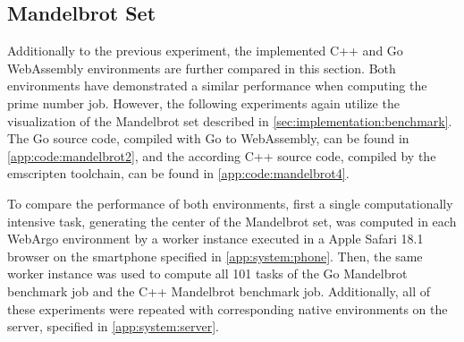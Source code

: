 \subsection{Mandelbrot Set}
Additionally to the previous experiment, the implemented C++ and Go WebAssembly environments are further compared in this section. Both environments have demonstrated a similar performance when computing the prime number job. However, the following experiments again utilize the visualization of the Mandelbrot set described in \autoref{sec:implementation:benchmark}. The Go source code, compiled with Go \cite{methodology:go} to WebAssembly, can be found in \autoref{app:code:mandelbrot2}, and the according C++ source code, compiled by the emscripten \cite{methodology:emcc} toolchain, can be found in \autoref{app:code:mandelbrot4}.

To compare the performance of both environments, first a single computationally intensive task, generating the center of the Mandelbrot set, was computed in each WebArgo environment by a worker instance executed in a Apple Safari 18.1 \cite{evaluation:safari} browser on the smartphone specified in \autoref{app:system:phone}. Then, the same worker instance was used to compute all 101 tasks of the Go Mandelbrot benchmark job and the C++ Mandelbrot benchmark job. Additionally, all of these experiments were repeated with corresponding native environments on the server, specified in \autoref{app:system:server}.

